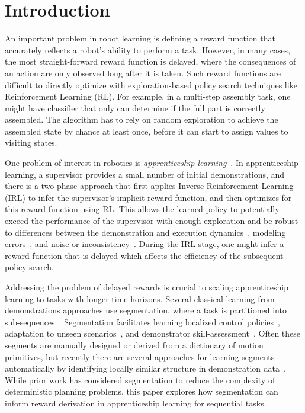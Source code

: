 \section{Introduction}
An important problem in robot learning is defining a reward function that accurately reflects a robot's ability to perform a task.
However, in many cases, the most straight-forward reward function is delayed, where the consequences of an action are only observed long after it is taken.
Such reward functions are difficult to directly optimize with exploration-based policy search techniques like Reinforcement Learning (RL).
For example, in a multi-step assembly task, one might have classifier that only can determine if the full part is correctly assembled.
The algorithm has to rely on random exploration to achieve the assembled state by chance at least once, before it can start to assign values to visiting states.

One problem of interest in robotics is \emph{apprenticeship learning}~\cite{DBLP:conf/nips/KolterAN07, coates2008learning, abbeel2004apprenticeship}.
In apprenticeship learning, a supervisor provides a small number of initial demonstrations, and there is a two-phase approach that first applies Inverse Reinforcement Learning (IRL) to infer the supervisor's implicit reward function, and then optimizes for this reward function using RL.
This allows the learned policy to potentially exceed the performance of the supervisor with enough exploration and be robust to differences between the demonstration and execution dynamics~\cite{abbeel2004apprenticeship}, modeling errors~\cite{ross2011reduction}, and noise or inconsistency~\cite{krishnan2015tsc}. 
During the IRL stage, one might infer a reward function that is delayed which affects the efficiency of the subsequent policy search.

Addressing the problem of delayed rewards is crucial to scaling apprenticeship learning to tasks with longer time horizons.
Several classical learning from demonstrations approaches use segmentation, where a task is partitioned into sub-sequences~\cite{argall2009survey}.
Segmentation facilitates learning localized control policies~\citep{murali2015learning, niekum2012learning, konidaris2011robot}, adaptation to unseen scenarios~\citep{ijspreet2002learning, ude2010task}, and demonstrator skill-assessment~\citep{reiley2010motion, gao2014jigsaws}.
Often these segments are manually designed or derived from a dictionary of motion primitives, but recently there are several approaches for learning segments automatically by identifying locally similar structure in demonstration data~\citep{barbivc2004segmenting, chiappa2010movement,  alvarez2010switched,calinon2010learning, kruger2012imitation, niekum2012learning, wachter2015hierarchical, lee2015autonomous}.
While prior work has considered segmentation to reduce the complexity of deterministic planning problems, this paper explores how segmentation can inform reward derivation in apprenticeship learning for sequential tasks.

